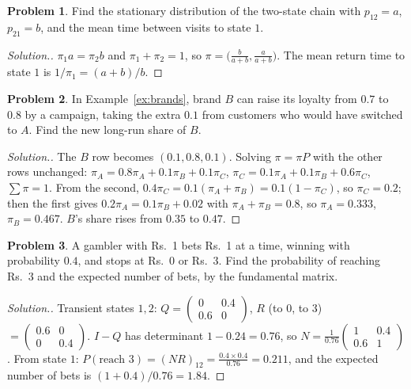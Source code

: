 \documentclass[11pt,a4paper]{article}
\numberwithin{equation}{section}
\theoremstyle{definition}
\newtheorem{problemx}{Problem}[subsection]
\newenvironment{problem}{\begin{problemx}}{\end{problemx}}
\newenvironment{solution}
  {\renewcommand{\qedsymbol}{}\begin{proof}[\textit{Solution}.]}
  {\end{proof}}
\begin{document}
\begin{problem}
Find the stationary distribution of the two-state chain with $p_{12} = a$, $p_{21} = b$, and the mean time between visits to state $1$.
\end{problem}

\begin{solution}
$\pi_1a = \pi_2b$ and $\pi_1 + \pi_2 = 1$, so $\pi = \bigl(\frac b{a + b}, \frac a{a + b}\bigr)$. The mean return time to state $1$ is $1/\pi_1 = (a + b)/b$.
\end{solution}

\begin{problem}
In Example~\ref{ex:brands}, brand $B$ can raise its loyalty from $0.7$ to $0.8$ by a campaign, taking the extra $0.1$ from customers who would have switched to $A$. Find the new long-run share of $B$.
\end{problem}

\begin{solution}
The $B$ row becomes $(0.1, 0.8, 0.1)$. Solving $\pi = \pi P$ with the other rows unchanged: $\pi_A = 0.8\pi_A + 0.1\pi_B + 0.1\pi_C$, $\pi_C = 0.1\pi_A + 0.1\pi_B + 0.6\pi_C$, $\sum\pi = 1$. From the second, $0.4\pi_C = 0.1(\pi_A + \pi_B) = 0.1(1 - \pi_C)$, so $\pi_C = 0.2$; then the first gives
$0.2\pi_A = 0.1\pi_B + 0.02$ with $\pi_A + \pi_B = 0.8$, so $\pi_A = 0.333$, $\pi_B = 0.467$. $B$'s share rises from $0.35$ to $0.47$.
\end{solution}

\begin{problem}
A gambler with Rs.~1 bets Rs.~1 at a time, winning with probability $0.4$, and stops at Rs.~0 or Rs.~3. Find the probability of reaching Rs.~3 and the expected number of bets, by the fundamental matrix.
\end{problem}

\begin{solution}
Transient states $1, 2$: $Q = \begin{pmatrix} 0 & 0.4 \\ 0.6 & 0 \end{pmatrix}$, $R$ (to $0$, to $3$) $= \begin{pmatrix} 0.6 & 0 \\ 0 & 0.4 \end{pmatrix}$. $I - Q$ has determinant $1 - 0.24 = 0.76$, so $N = \frac1{0.76}\begin{pmatrix} 1 & 0.4 \\ 0.6 & 1 \end{pmatrix}$. From state $1$:
$P(\text{reach } 3) = (NR)_{12} = \frac{0.4 \times 0.4}{0.76} = 0.211$, and the expected number of bets is $(1 + 0.4)/0.76 = 1.84$.
\end{solution}
\end{document}
